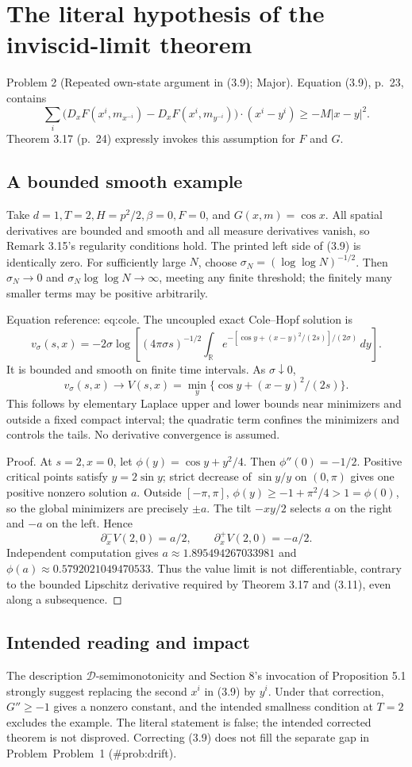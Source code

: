 \documentclass[10pt]{article}
\begin{document}
\section*{The literal hypothesis of the inviscid-limit theorem}
Problem 2 (Repeated own-state argument in (3.9); Major).  Equation (3.9), p. 23, contains \[\sum_i\bigl(D_xF(x^i,m_{x^{-i}})
-D_xF(x^i,m_{y^{-i}})\bigr)\cdot(x^i-y^i)\ge-M|x-y|^2.\] Theorem 3.17 (p. 24) expressly invokes this assumption for \(F\) and \(G\).\par
\subsection*{A bounded smooth example}
Take \(d=1,T=2,H=p^2/2,\beta=0,F=0\), and \(G(x,m)=\cos x\). All spatial derivatives are bounded and smooth and all measure derivatives vanish, so Remark 3.15’s regularity conditions hold. The printed left side of (3.9) is identically zero. For sufficiently large \(N\), choose \(\sigma_N=(\log\log N)^{-1/2}\). Then \(\sigma_N\to0\) and \(\sigma_N\log\log N\to\infty\), meeting any finite threshold; the finitely many smaller terms may be positive arbitrarily.\par
Equation reference: eq:cole. The uncoupled exact Cole–Hopf solution is \[
v_\sigma(s,x)=-2\sigma\log\left[
(4\pi\sigma s)^{-1/2}\int_\mathbb R
e^{-[\cos y+(x-y)^2/(2s)]/(2\sigma)}\,dy\right].\] It is bounded and smooth on finite time intervals. As \(\sigma\downarrow0\), \[v_\sigma(s,x)\longrightarrow V(s,x)=\min_y\{\cos y+(x-y)^2/(2s)\}.\] This follows by elementary Laplace upper and lower bounds near minimizers and outside a fixed compact interval; the quadratic term confines the minimizers and controls the tails. No derivative convergence is assumed.\par
Proof. At \(s=2,x=0\), let \(\phi(y)=\cos y+y^2/4\). Then \(\phi''(0)=-1/2\). Positive critical points satisfy \(y=2\sin y\); strict decrease of \(\sin y/y\) on \((0,\pi)\) gives one positive nonzero solution \(a\). Outside \([-\pi,\pi]\), \(\phi(y)\ge-1+\pi^2/4>1=\phi(0)\), so the global minimizers are precisely \(\pm a\). The tilt \(-xy/2\) selects \(a\) on the right and \(-a\) on the left. Hence \[\partial_x^-V(2,0)=a/2,\qquad \partial_x^+V(2,0)=-a/2.\] Independent computation gives \(a\approx1.895494267033981\) and \(\phi(a)\approx0.5792021049470533\). Thus the value limit is not differentiable, contrary to the bounded Lipschitz derivative required by Theorem 3.17 and (3.11), even along a subsequence. ◻\par
\subsection*{Intended reading and impact}
The description \(\mathcal D\)-semimonotonicity and Section 8’s invocation of Proposition 5.1 strongly suggest replacing the second \(x^i\) in (3.9) by \(y^i\). Under that correction, \(G''\ge-1\) gives a nonzero constant, and the intended smallness condition at \(T=2\) excludes the example. The literal statement is false; the intended corrected theorem is not disproved. Correcting (3.9) does not fill the separate gap in Problem Problem 1 (\#prob:drift).\par
\end{document}
